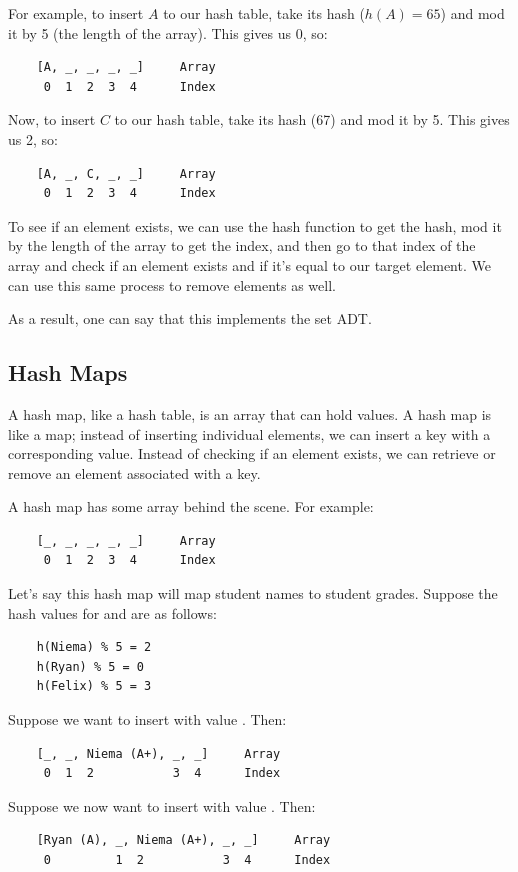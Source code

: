 \documentclass[letterpaper]{article}
\begin{document}
\bigskip 

For example, to insert $A$ to our hash table, take its hash ($h(A) = 65$) and mod it by 5 (the length of the array). This gives us 0, so: 
\begin{verbatim}
    [A, _, _, _, _]     Array 
     0  1  2  3  4      Index 
\end{verbatim}
Now, to insert $C$ to our hash table, take its hash (67) and mod it by 5. This gives us 2, so:
\begin{verbatim}
    [A, _, C, _, _]     Array 
     0  1  2  3  4      Index 
\end{verbatim}

To see if an element exists, we can use the hash function to get the hash, mod it by the length of the array to get the index, and then go to that index of the array and check if an element exists and if it's equal to our target element. We can use this same process to remove elements as well.

\bigskip

As a result, one can say that this implements the set ADT. 

\subsection{Hash Maps}
A hash map, like a hash table, is an array that can hold values. A hash map is like a map; instead of inserting individual elements, we can insert a key with a corresponding value. Instead of checking if an element exists, we can retrieve or remove an element associated with a key. 

\bigskip

A hash map has some array behind the scene. For example: 
\begin{verbatim}
    [_, _, _, _, _]     Array 
     0  1  2  3  4      Index 
\end{verbatim}
Let's say this hash map will map student names to student grades. Suppose the hash values for  and  are as follows: 
\begin{verbatim}
    h(Niema) % 5 = 2
    h(Ryan) % 5 = 0
    h(Felix) % 5 = 3
\end{verbatim}

Suppose we want to insert  with value . Then: 
\begin{verbatim}
    [_, _, Niema (A+), _, _]     Array 
     0  1  2           3  4      Index 
\end{verbatim}
Suppose we now want to insert  with value . Then: 
\begin{verbatim}
    [Ryan (A), _, Niema (A+), _, _]     Array 
     0         1  2           3  4      Index 
\end{verbatim}
\end{document}
